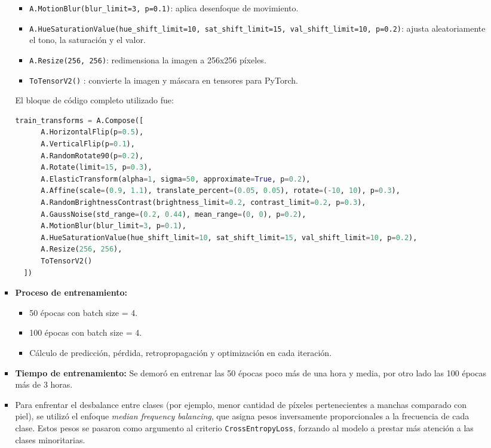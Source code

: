\begin{enumerate}
\begin{itemize}
\begin{itemize}
\begin{itemize}
  \item \texttt{A.MotionBlur(blur\_limit=3, p=0.1)}: aplica desenfoque de movimiento.
  \item \texttt{A.HueSaturationValue(hue\_shift\_limit=10, sat\_shift\_limit=15, val\_shift\_limit=10, p=0.2)}: ajusta aleatoriamente el tono, la saturación y el valor.
  \item \texttt{A.Resize(256, 256)}: redimensiona la imagen a 256x256 píxeles.
  \item \texttt{ToTensorV2()} : convierte la imagen y máscara en tensores para PyTorch.
  \end{itemize}
  El bloque de código completo utilizado fue:
  \begin{lstlisting}[language=Python]
  train_transforms = A.Compose([
      A.HorizontalFlip(p=0.5),
      A.VerticalFlip(p=0.1),
      A.RandomRotate90(p=0.2),
      A.Rotate(limit=15, p=0.3),
      A.ElasticTransform(alpha=1, sigma=50, approximate=True, p=0.2),
      A.Affine(scale=(0.9, 1.1), translate_percent=(0.05, 0.05), rotate=(-10, 10), p=0.3),
      A.RandomBrightnessContrast(brightness_limit=0.2, contrast_limit=0.2, p=0.3),
      A.GaussNoise(std_range=(0.2, 0.44), mean_range=(0, 0), p=0.2),
      A.MotionBlur(blur_limit=3, p=0.1),
      A.HueSaturationValue(hue_shift_limit=10, sat_shift_limit=15, val_shift_limit=10, p=0.2),
      A.Resize(256, 256),
      ToTensorV2()
  ])
  \end{lstlisting}

  \item \textbf{Proceso de entrenamiento:}
  \begin{itemize}
    \item 50 épocas con batch size = 4.
    \item 100 épocas con batch size = 4.
    \item Cálculo de predicción, pérdida, retropropagación y optimización en cada iteración.
  \end{itemize}

  \item \textbf{Tiempo de entrenamiento:}
  Se demoró en entrenar las 50 épocas poco más de una hora y media, por otro lado las 100 épocas más de 3 horas.

\item Para enfrentar el desbalance entre clases (por ejemplo, menor cantidad de píxeles pertenecientes a manchas comparado con piel), se utilizó el enfoque \emph{median frequency balancing}, que asigna pesos inversamente proporcionales a la frecuencia de cada clase. Estos pesos se pasaron como argumento al criterio \texttt{CrossEntropyLoss}, forzando al modelo a prestar más atención a las clases minoritarias.


\end{itemize}
\end{itemize}
\end{enumerate}
